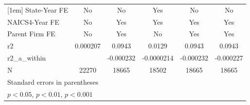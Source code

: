 {\begin{tabular}{l*{5}{c}}
[1em]
State-Year FE&          No         &          No         &         Yes         &          No         &          No         \\
[1em]
NAICS4-Year FE&          No         &         Yes         &         Yes         &         Yes         &         Yes         \\
[1em]
Parent Firm FE&          No         &         Yes         &          No         &         Yes         &         Yes         \\
\hline
r2          &    0.000207         &      0.0943         &      0.0129         &      0.0943         &      0.0943         \\
r2\_a\_within &                     &   -0.000232         &  -0.0000214         &   -0.000232         &   -0.000227         \\
N           &       22270         &       18665         &       18502         &       18665         &       18665         \\
\hline\hline
\multicolumn{6}{l}{\footnotesize Standard errors in parentheses}\\
\multicolumn{6}{l}{\footnotesize \sym{*} \(p<0.05\), \sym{**} \(p<0.01\), \sym{***} \(p<0.001\)}\\
\end{tabular}
}
